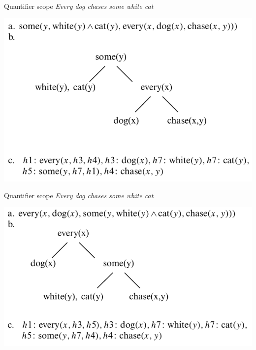 \documentclass{beamer}
\begin{document}
\begin{frame}{Quantifier scope}
  {\it Every dog chases some white cat}

  \vspace{0.7cm}

  \centering\includegraphics[width=\textwidth]{figures/scope1}
\end{frame}

\begin{frame}{Quantifier scope}
{\it Every dog chases some white cat}

\vspace{0.7cm}

\centering
\includegraphics[width=\textwidth]{figures/scope2}
\end{frame}
\end{document}
